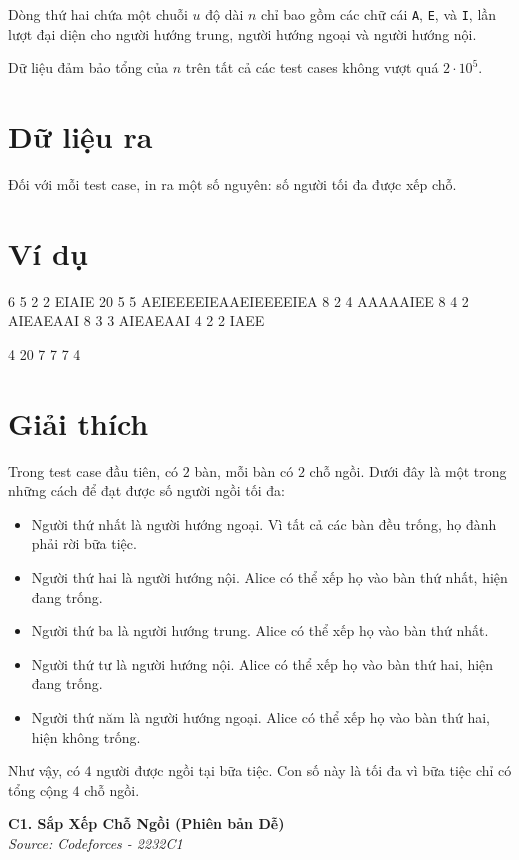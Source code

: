 \documentclass[11pt]{article}
\newcommand{\problem}[2]{
    \begin{problembox}
    \begin{center}
        \Large \textbf{#1} \\
        \vspace{0.2cm}
        \small \textit{Source: #2}
    \end{center}
    \end{problembox}
}
\begin{document}
Dòng thứ hai chứa một chuỗi $u$ độ dài $n$ chỉ bao gồm các chữ cái \texttt{A}, \texttt{E}, và \texttt{I}, lần lượt đại diện cho người hướng trung, người hướng ngoại và người hướng nội.

Dữ liệu đảm bảo tổng của $n$ trên tất cả các test cases không vượt quá $2 \cdot 10^5$.

\section*{Dữ liệu ra}
Đối với mỗi test case, in ra một số nguyên: số người tối đa được xếp chỗ.

\section*{Ví dụ}


\begin{inputbox}6
5 2 2
EIAIE
20 5 5
AEIEEEEIEAAEIEEEEIEA
8 2 4
AAAAAIEE
8 4 2
AIEAEAAI
8 3 3
AIEAEAAI
4 2 2
IAEE
\end{inputbox}
\begin{outputbox}4
20
7
7
7
4
\end{outputbox}



\section*{Giải thích}
Trong test case đầu tiên, có $2$ bàn, mỗi bàn có $2$ chỗ ngồi. Dưới đây là một trong những cách để đạt được số người ngồi tối đa:
\begin{itemize}
    \item Người thứ nhất là người hướng ngoại. Vì tất cả các bàn đều trống, họ đành phải rời bữa tiệc.
    \item Người thứ hai là người hướng nội. Alice có thể xếp họ vào bàn thứ nhất, hiện đang trống.
    \item Người thứ ba là người hướng trung. Alice có thể xếp họ vào bàn thứ nhất.
    \item Người thứ tư là người hướng nội. Alice có thể xếp họ vào bàn thứ hai, hiện đang trống.
    \item Người thứ năm là người hướng ngoại. Alice có thể xếp họ vào bàn thứ hai, hiện không trống.
\end{itemize}
Như vậy, có $4$ người được ngồi tại bữa tiệc. Con số này là tối đa vì bữa tiệc chỉ có tổng cộng $4$ chỗ ngồi.

\newpage
\problem{C1. Sắp Xếp Chỗ Ngồi (Phiên bản Dễ)}{Codeforces - 2232C1}
\end{document}
